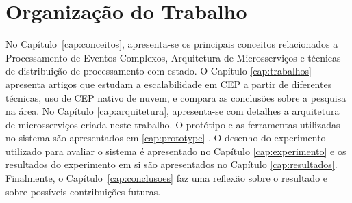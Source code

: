 






\section{Organização do Trabalho}
\label{sec:organizacao_trabalho}


No Capítulo~\ref{cap:conceitos}, apresenta-se os principais conceitos relacionados a Processamento de Eventos Complexos, Arquitetura de Microsserviços e técnicas de distribuição de processamento com estado. O Capítulo \ref{cap:trabalhos} apresenta artigos que estudam a escalabilidade em CEP a partir de diferentes técnicas, uso de CEP nativo de nuvem, e compara as conclusões sobre a pesquisa na área. No Capítulo \ref{cap:arquitetura}, apresenta-se com detalhes a arquitetura de microsserviços criada neste trabalho. O protótipo e as ferramentas utilizadas no sistema  são apresentados em \ref{cap:prototype} . O desenho do experimento utilizado para avaliar o sistema é apresentado no Capítulo \ref{cap:experimento} e os resultados do experimento em si são apresentados no Capítulo \ref{cap:resultados}. Finalmente, o Capítulo~\ref{cap:conclusoes} faz uma reflexão sobre o resultado e sobre possíveis contribuições futuras.

